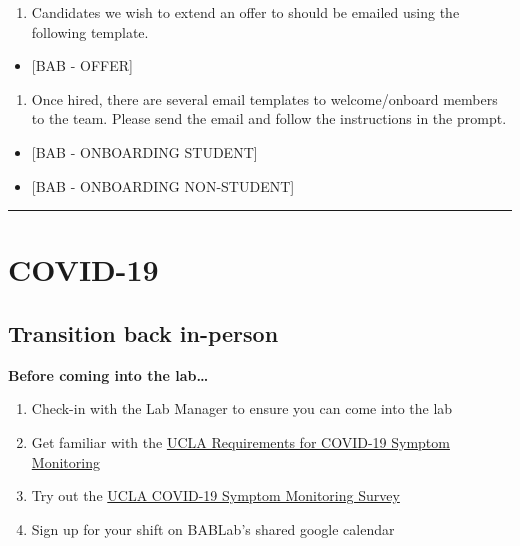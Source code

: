 \documentclass[
]{book}
\providecommand{\tightlist}{%
  \setlength{\itemsep}{0pt}\setlength{\parskip}{0pt}}
\begin{document}
\begin{enumerate}
\def\labelenumi{\arabic{enumi}.}
\setcounter{enumi}{2}
\tightlist
\item
  Candidates we wish to extend an offer to should be emailed using the following template.
\end{enumerate}

\begin{itemize}
\tightlist
\item
  {[}BAB - OFFER{]}
\end{itemize}

\begin{enumerate}
\def\labelenumi{\arabic{enumi}.}
\setcounter{enumi}{3}
\tightlist
\item
  Once hired, there are several email templates to welcome/onboard members to the team. Please send the email and follow the instructions in the prompt.
\end{enumerate}

\begin{itemize}
\tightlist
\item
  {[}BAB - ONBOARDING STUDENT{]}
\item
  {[}BAB - ONBOARDING NON-STUDENT{]}
\end{itemize}

\begin{center}\rule{0.5\linewidth}{0.5pt}\end{center}

\hypertarget{covid-19}{%
\section{COVID-19}\label{covid-19}}

\hypertarget{transition-back-in-person}{%
\subsection{Transition back in-person}\label{transition-back-in-person}}

\textbf{Before coming into the lab\ldots{}}

\begin{enumerate}
\def\labelenumi{\arabic{enumi}.}
\item
  Check-in with the Lab Manager to ensure you can come into the lab
\item
  Get familiar with the \href{https://ucla.app.box.com/s/96on1j6ynhy5c91jdpxxqyi39pl8x796}{UCLA Requirements for COVID-19 Symptom Monitoring}
\item
  Try out the \href{https://www.adminvc.ucla.edu/covid-19/ucla-employee-faq/symptom-monitoring}{UCLA COVID-19 Symptom Monitoring Survey}
\item
  Sign up for your shift on BABLab's shared google calendar
\end{enumerate}
\end{document}
